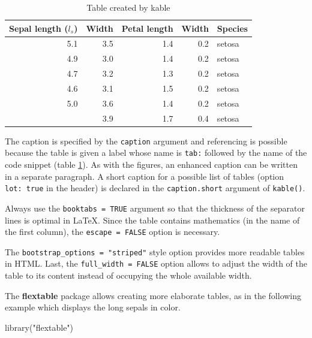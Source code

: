 \documentclass[
  12pt,
  american,
  a4paper,
  extrafontsizes,onecolumn,openright
  ]{memoir}
\newenvironment{Shaded}{\begin{snugshade}}{\end{snugshade}}
\newcommand{\FunctionTok}[1]{\textcolor[rgb]{0.00,0.00,0.00}{#1}}
\newcommand{\NormalTok}[1]{#1}
\newcommand{\StringTok}[1]{\textcolor[rgb]{0.31,0.60,0.02}{#1}}
\begin{document}
\begin{table}

\caption{\label{tab:kable}Table created by kable}
\centering
\begin{tabular}[t]{rrrrl}
\toprule
Sepal length ($l_s$) & Width & Petal length & Width & Species\\
\midrule
5.1 & 3.5 & 1.4 & 0.2 & setosa\\
4.9 & 3.0 & 1.4 & 0.2 & setosa\\
4.7 & 3.2 & 1.3 & 0.2 & setosa\\
4.6 & 3.1 & 1.5 & 0.2 & setosa\\
5.0 & 3.6 & 1.4 & 0.2 & setosa\\
\addlinespace
5.4 & 3.9 & 1.7 & 0.4 & setosa\\
\bottomrule
\end{tabular}
\end{table}

\normalsize

The caption is specified by the \texttt{caption} argument and referencing is possible because the table is given a label whose name is \texttt{tab:} followed by the name of the code snippet (table \ref{tab:kable}).
As with the figures, an enhanced caption can be written in a separate paragraph.
A short caption for a possible list of tables (option \texttt{lot:\ true} in the header) is declared in the \texttt{caption.short} argument of \texttt{kable()}.

Always use the \texttt{booktabs\ =\ TRUE} argument so that the thickness of the separator lines is optimal in LaTeX.
Since the table contains mathematics (in the name of the first column), the \texttt{escape\ =\ FALSE} option is necessary.

The \texttt{bootstrap\_options\ =\ "striped"} style option provides more readable tables in HTML.
Last, the \texttt{full\_width\ =\ FALSE} option allows to adjust the width of the table to its content instead of occupying the whole available width.

The \textbf{flextable} package allows creating more elaborate tables, as in the following example which displays the long sepals in color.

\scriptsize

\begin{Shaded}
\begin{Highlighting}[]
\FunctionTok{library}\NormalTok{(}\StringTok{"flextable"}\NormalTok{)}
\end{Highlighting}
\end{Shaded}
\end{document}
